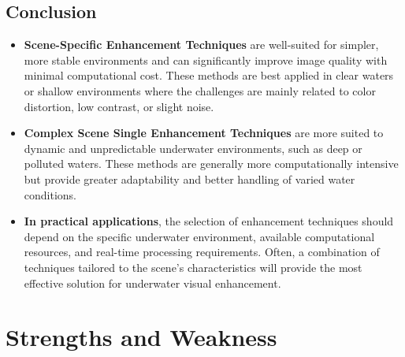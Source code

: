 \documentclass[withoutpreface,bwprint]{cumcmthesis}
\begin{document}
\subsection{Conclusion}

\begin{itemize}
    \item \textbf{Scene-Specific Enhancement Techniques} are well-suited for simpler, more stable environments and can significantly improve image quality with minimal computational cost. These methods are best applied in clear waters or shallow environments where the challenges are mainly related to color distortion, low contrast, or slight noise.

    \item \textbf{Complex Scene Single Enhancement Techniques} are more suited to dynamic and unpredictable underwater environments, such as deep or polluted waters. These methods are generally more computationally intensive but provide greater adaptability and better handling of varied water conditions.

    \item \textbf{In practical applications}, the selection of enhancement techniques should depend on the specific underwater environment, available computational resources, and real-time processing requirements. Often, a combination of techniques tailored to the scene’s characteristics will provide the most effective solution for underwater visual enhancement.
\end{itemize}

\newpage
\section{Strengths and Weakness}
\end{document}
